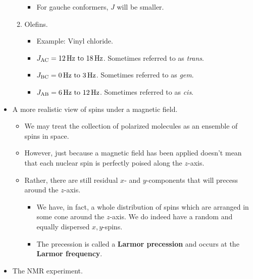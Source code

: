 \documentclass[../notes.tex]{subfiles}
\begin{document}
\begin{itemize}
\begin{enumerate}
\begin{itemize}
            \item For gauche conformers, $J$ will be smaller.
        \end{itemize}
        \item Olefins.
        \begin{itemize}
            \item Example: Vinyl chloride.
            \item $J_{\ce{AC}}=\SIrange{12}{18}{\hertz}$. Sometimes referred to as \emph{trans}.
            \item $J_{\ce{BC}}=\SIrange{0}{3}{\hertz}$. Sometimes referred to as \emph{gem}.
            \item $J_{\ce{AB}}=\SIrange{6}{12}{\hertz}$. Sometimes referred to as \emph{cis}.
        \end{itemize}
    \end{enumerate}
    \item A more realistic view of spins under a magnetic field.
    \begin{itemize}
        \item We may treat the collection of polarized molecules as an ensemble of spins in space.
        \item However, just because a magnetic field has been applied doesn't mean that each nuclear spin is perfectly poised along the $z$-axis.
        \item Rather, there are still residual $x$- and $y$-components that will precess around the $z$-axis.
        \begin{itemize}
            \item We have, in fact, a whole distribution of spins which are arranged in some cone around the $z$-axis. We do indeed have a random and equally dispersed $x,y$-spins.
            \item The precession is called a \textbf{Larmor precession} and occurs at the \textbf{Larmor frequency}.
        \end{itemize}
    \end{itemize}
    \item The NMR experiment.
    \begin{itemize}

\end{itemize}
\end{itemize}
\end{document}
